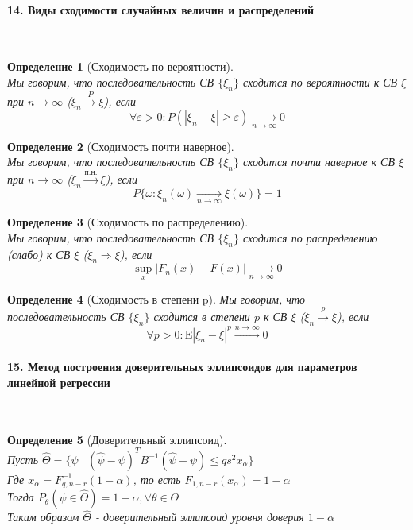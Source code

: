\documentclass[titlepage]{article}
\newcommand{\sE}{\mathrm{E}}
\newtheorem{definition}{Определение}
\begin{document}
\paragraph{14. Виды сходимости случайных величин и распределений} ~\\
\begin{definition}[Сходимость по вероятности] ~\\
	Мы говорим, что последовательность СВ $\{\xi_n\}$ сходится по вероятности к СВ $\xi$ при $n\rightarrow\infty$ ($\xi_n\overset{P}{\rightarrow}\xi$), если
	\[\forall \varepsilon > 0 : P(|\xi_n-\xi|\geq\varepsilon)\underset{n\rightarrow\infty}{\longrightarrow}0\]
\end{definition}
\begin{definition}[Сходимость почти наверное] ~\\
	Мы говорим, что последовательность СВ $\{\xi_n\}$ сходится почти наверное к СВ $\xi$ при $n\rightarrow\infty$ ($\xi_n \xrightarrow{\text{п.н.}} \xi$), если
	\[P\{\omega:\xi_n(\omega)\underset{n\rightarrow\infty}{\longrightarrow}\xi(\omega)\}=1\]
\end{definition}
\begin{definition}[Сходимость по распределению] ~\\
	Мы говорим, что последовательность СВ $\{\xi_n\}$ сходится по распределению (слабо) к СВ $\xi$ ($\xi_n\Rightarrow\xi$), если
	\[\underset{x}{\sup}|F_n(x) - F(x)|\underset{n\rightarrow\infty}{\longrightarrow}0\]
\end{definition}
\begin{definition}[Сходимость в степени p]
	Мы говорим, что последовательность СВ $\{\xi_n\}$ сходится в степени $p$ к СВ $\xi$ ($\xi_n\overset{p}{\rightarrow}\xi$), если
	\[\forall p > 0: \sE|\xi_n-\xi|^p\overset{n\rightarrow\infty}{\longrightarrow}0\]
\end{definition}

\paragraph{15. Метод построения доверительных эллипсоидов для параметров линейной регрессии} ~\\
\begin{definition}[Доверительный эллипсоид] ~\\
Пусть $\hat\Theta = \{\psi \mid (\hat\psi - \psi)^TB^{-1}(\hat\psi - \psi) \leq qs^2x_\alpha\}$\\
Где $x_\alpha = F^{-1}_{q,n-r}(1-\alpha)$, то есть $F_{1,n-r}(x_\alpha)=1-\alpha$\\
Тогда $P_\theta(\psi \in \hat\Theta) = 1-\alpha, \forall \theta \in \Theta$\\
Таким образом $\hat\Theta$ - доверительный эллипсоид уровня доверия $1-\alpha$
\end{definition}
\end{document}
